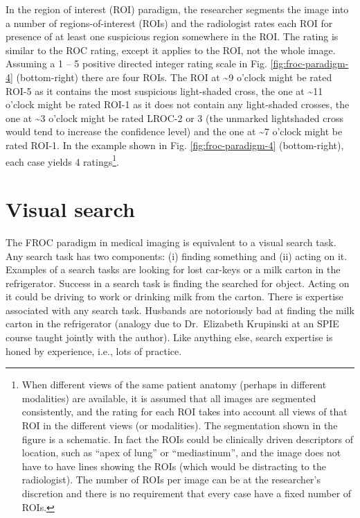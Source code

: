 \documentclass[
]{book}
\begin{document}
\begin{itemize}
  In the region of interest (ROI) paradigm, the researcher segments the image into a number of regions-of-interest (ROIs) and the radiologist rates each ROI for presence of at least one suspicious region somewhere in the ROI. The rating is similar to the ROC rating, except it applies to the ROI, not the whole image. Assuming a 1 -- 5 positive directed integer rating scale in Fig. \ref{fig:froc-paradigm-4} (bottom-right) there are four ROIs. The ROI at \textasciitilde9 o'clock might be rated ROI-5 as it contains the most suspicious light-shaded cross, the one at \textasciitilde11 o'clock might be rated ROI-1 as it does not contain any light-shaded crosses, the one at \textasciitilde3 o'clock might be rated LROC-2 or 3 (the unmarked lightshaded cross would tend to increase the confidence level) and the one at \textasciitilde7 o'clock might be rated ROI-1. In the example shown in Fig. \ref{fig:froc-paradigm-4} (bottom-right), each case yields 4 ratings\footnote{When different views of the same patient anatomy (perhaps in different modalities) are available, it is assumed that all images are segmented consistently, and the rating for each ROI takes into account all views of that ROI in the different views (or modalities). The segmentation shown in the figure is a schematic. In fact the ROIs could be clinically driven descriptors of location, such as ``apex of lung'' or ``mediastinum'', and the image does not have to have lines showing the ROIs (which would be distracting to the radiologist). The number of ROIs per image can be at the researcher's discretion and there is no requirement that every case have a fixed number of ROIs.}.
\end{itemize}

\hypertarget{froc-paradigm-vis-search}{%
\section{Visual search}\label{froc-paradigm-vis-search}}

The FROC paradigm in medical imaging is equivalent to a visual search task. Any search task has two components: (i) finding something and (ii) acting on it. Examples of a search tasks are looking for lost car-keys or a milk carton in the refrigerator. Success in a search task is finding the searched for object. Acting on it could be driving to work or drinking milk from the carton. There is expertise associated with any search task. Husbands are notoriously bad at finding the milk carton in the refrigerator (analogy due to Dr.~Elizabeth Krupinski at an SPIE course taught jointly with the author). Like anything else, search expertise is honed by experience, i.e., lots of practice.
\end{document}
